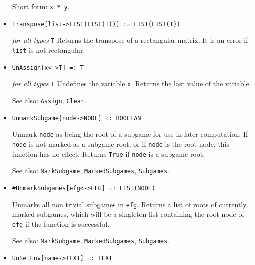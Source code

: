 \begin{itemize}
{\it for} {\tt T = FLOAT, RATIONAL}
\bd
Computes the product of \verb+x+ and \verb+y+.
\item [Short form:] \verb+x * y+.
\ed

\item
\protect \large \begin{verbatim} 
Transpose[list->LIST(LIST(T))] := LIST(LIST(T))
\end{verbatim}\normalsize

{\it for all types} {\tt T}
\bd
Returns the transpose of a rectangular matrix.  It is an error if \verb+list+
is not rectangular.
\ed



\item
\protect \large \begin{verbatim}
UnAssign[x<->T] =: T
\end{verbatim}\normalsize

{\it for all types} {\tt T}
\bd
Undefines the variable \verb+x+.  Returns the
last value of the variable.
\item [See also:] \verb+Assign+, \verb+Clear+.
\ed

\item
\protect \large \begin{verbatim}
UnmarkSubgame[node->NODE] =: BOOLEAN
\end{verbatim}\normalsize

\bd
Unmark \verb+node+ as being the root of a subgame for use in later
computation.  If \verb+node+ is not marked as a subgame root, or if
\verb+node+ is the root node, this function has no effect.  Returns
\verb+True+ if \verb+node+ is a subgame root.
\item [See also:] \verb+MarkSubgame+, \verb+MarkedSubgames+,
\verb+Subgames+.
\ed

\item
\protect \large \begin{verbatim}
#UnmarkSubgames[efg<->EFG] =: LIST(NODE) 
\end{verbatim}\normalsize

\bd 
Unmarks all non trivial subgames in \verb+efg+.  Returns a list of
roots of currently marked subgames, which will be a singleton list
containing the root node of \verb+efg+ if the function is successful.
\item [See also:] \verb+MarkSubgame+, \verb+MarkedSubgames+,
\verb+Subgames+.
\ed

\item
\protect \large \begin{verbatim}
UnSetEnv[name->TEXT] =: TEXT
\end{verbatim} \normalsize


\end{itemize}
